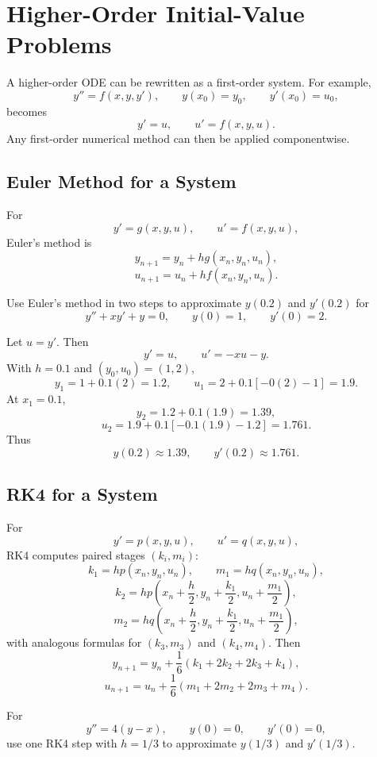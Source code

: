 \section{Higher-Order Initial-Value Problems}

A higher-order ODE can be rewritten as a first-order system.  For example,
\[
 y''=f(x,y,y'),
 \qquad y(x_0)=y_0,
 \qquad y'(x_0)=u_0,
\]
becomes
\[
 y'=u,
 \qquad
 u'=f(x,y,u).
\]
Any first-order numerical method can then be applied componentwise.

\subsection{Euler Method for a System}

For
\[
 y'=g(x,y,u),
 \qquad
 u'=f(x,y,u),
\]
Euler's method is
\[
 y_{n+1}=y_n+hg(x_n,y_n,u_n),
\]
\[
 u_{n+1}=u_n+hf(x_n,y_n,u_n).
\]

\begin{example}
Use Euler's method in two steps to approximate $y(0.2)$ and $y'(0.2)$ for
\[
 y''+xy'+y=0,
 \qquad y(0)=1,
 \qquad y'(0)=2.
\]
\end{example}

\begin{solution}[4.8cm]
Let $u=y'$.  Then
\[
 y'=u,
 \qquad
 u'=-xu-y.
\]
With $h=0.1$ and $(y_0,u_0)=(1,2)$,
\[
 y_1=1+0.1(2)=1.2,
 \qquad
 u_1=2+0.1[-0(2)-1]=1.9.
\]
At $x_1=0.1$,
\[
 y_2=1.2+0.1(1.9)=1.39,
\]
\[
 u_2=1.9+0.1[-0.1(1.9)-1.2]=1.761.
\]
Thus
\[
 y(0.2)\approx1.39,
 \qquad
 y'(0.2)\approx1.761.
\]
\end{solution}

\subsection{RK4 for a System}

For
\[
 y'=p(x,y,u),
 \qquad
 u'=q(x,y,u),
\]
RK4 computes paired stages $(k_i,m_i)$:
\[
 k_1=hp(x_n,y_n,u_n),
 \qquad
 m_1=hq(x_n,y_n,u_n),
\]
\[
 k_2=hp\left(x_n+\frac h2,y_n+\frac{k_1}{2},u_n+\frac{m_1}{2}\right),
\]
\[
 m_2=hq\left(x_n+\frac h2,y_n+\frac{k_1}{2},u_n+\frac{m_1}{2}\right),
\]
with analogous formulas for $(k_3,m_3)$ and $(k_4,m_4)$.  Then
\[
 y_{n+1}=y_n+\frac16(k_1+2k_2+2k_3+k_4),
\]
\[
 u_{n+1}=u_n+\frac16(m_1+2m_2+2m_3+m_4).
\]

\begin{example}
For
\[
 y''=4(y-x),
 \qquad y(0)=0,
 \qquad y'(0)=0,
\]
use one RK4 step with $h=1/3$ to approximate $y(1/3)$ and $y'(1/3)$.
\end{example}

